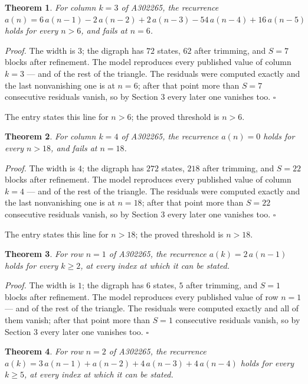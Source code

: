 \documentclass[11pt]{article}
\newtheorem{theorem}{Theorem}
\theoremstyle{definition}
\begin{document}
\begin{theorem} For column $k = 3$ of A302265, the recurrence $a(n) = 6\,a(n-1) - 2\,a(n-2) + 2\,a(n-3) - 54\,a(n-4) + 16\,a(n-5)$ holds for every $n > 6$, and fails at $n = 6$.\end{theorem}

{\itshape Proof.} The width is $3$; the digraph has $72$ states, $62$ after trimming, and $S = 7$ blocks after refinement. The model reproduces every published value of column $k = 3$ --- and of the rest of the triangle. The residuals were computed exactly and the last nonvanishing one is at $n = 6$; after that point more than $S = 7$ consecutive residuals vanish, so by Section 3 every later one vanishes too. $\square$

The entry states this line for $n > 6$; the proved threshold is $n > 6$.

\begin{theorem} For column $k = 4$ of A302265, the recurrence $a(n) = 0$ holds for every $n > 18$, and fails at $n = 18$.\end{theorem}

{\itshape Proof.} The width is $4$; the digraph has $272$ states, $218$ after trimming, and $S = 22$ blocks after refinement. The model reproduces every published value of column $k = 4$ --- and of the rest of the triangle. The residuals were computed exactly and the last nonvanishing one is at $n = 18$; after that point more than $S = 22$ consecutive residuals vanish, so by Section 3 every later one vanishes too. $\square$

The entry states this line for $n > 18$; the proved threshold is $n > 18$.

\begin{theorem} For row $n = 1$ of A302265, the recurrence $a(k) = 2\,a(n-1)$ holds for every $k \ge 2$, at every index at which it can be stated.\end{theorem}

{\itshape Proof.} The width is $1$; the digraph has $6$ states, $5$ after trimming, and $S = 1$ blocks after refinement. The model reproduces every published value of row $n = 1$ --- and of the rest of the triangle. The residuals were computed exactly and all of them vanish; after that point more than $S = 1$ consecutive residuals vanish, so by Section 3 every later one vanishes too. $\square$

\begin{theorem} For row $n = 2$ of A302265, the recurrence $a(k) = 3\,a(n-1) + a(n-2) + 4\,a(n-3) + 4\,a(n-4)$ holds for every $k \ge 5$, at every index at which it can be stated.\end{theorem}
\end{document}
